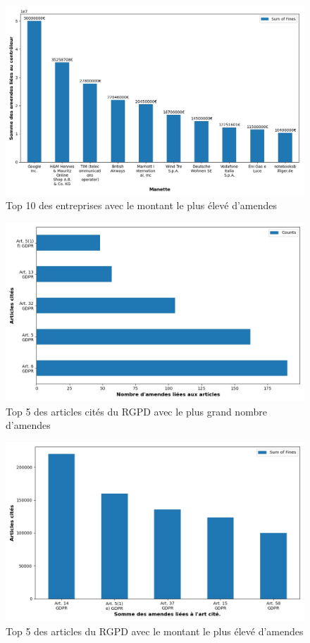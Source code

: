 \documentclass[french]{article}
\begin{document}
	\begin{figure}
		[H]\centering\includegraphics[width=0.6\linewidth]{graphs/top10_controller_fines}
		\caption{Top 10 des entreprises avec le montant le plus élevé d'amendes}
	 \end{figure}



\newpage


	\begin{multicols}{2}
	\begin{figure}
		[H]\centering\includegraphics[width=1\linewidth]{graphs/top10_quoted} 
		\caption{Top 5 des articles cités du RGPD avec le plus grand nombre d'amendes}
	\end{figure}
	\begin{figure}
		[H]\centering\includegraphics[width=1\linewidth]{graphs/top10_quoted_fines} 
		\caption{Top 5 des articles  du RGPD avec le montant le plus élevé d'amendes}
	\end{figure}
	\end{multicols}
	
\end{document}
